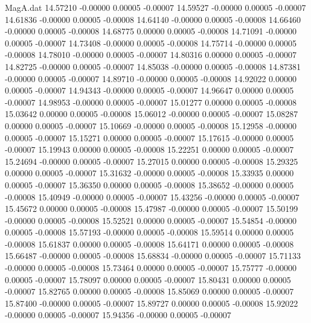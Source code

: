 \begin{filecontents}{MagA.dat}
  14.57210   -0.00000    0.00005   -0.00007
  14.59527   -0.00000    0.00005   -0.00007
  14.61836   -0.00000    0.00005   -0.00008
  14.64140   -0.00000    0.00005   -0.00008
  14.66460   -0.00000    0.00005   -0.00008
  14.68775    0.00000    0.00005   -0.00008
  14.71091   -0.00000    0.00005   -0.00007
  14.73408   -0.00000    0.00005   -0.00008
  14.75714   -0.00000    0.00005   -0.00008
  14.78010   -0.00000    0.00005   -0.00007
  14.80316    0.00000    0.00005   -0.00007
  14.82725   -0.00000    0.00005   -0.00007
  14.85038   -0.00000    0.00005   -0.00008
  14.87381   -0.00000    0.00005   -0.00007
  14.89710   -0.00000    0.00005   -0.00008
  14.92022    0.00000    0.00005   -0.00007
  14.94343   -0.00000    0.00005   -0.00007
  14.96647    0.00000    0.00005   -0.00007
  14.98953   -0.00000    0.00005   -0.00007
  15.01277    0.00000    0.00005   -0.00008
  15.03642    0.00000    0.00005   -0.00008
  15.06012   -0.00000    0.00005   -0.00007
  15.08287    0.00000    0.00005   -0.00007
  15.10669   -0.00000    0.00005   -0.00008
  15.12958   -0.00000    0.00005   -0.00007
  15.15271    0.00000    0.00005   -0.00007
  15.17615   -0.00000    0.00005   -0.00007
  15.19943    0.00000    0.00005   -0.00008
  15.22251    0.00000    0.00005   -0.00007
  15.24694   -0.00000    0.00005   -0.00007
  15.27015    0.00000    0.00005   -0.00008
  15.29325    0.00000    0.00005   -0.00007
  15.31632   -0.00000    0.00005   -0.00008
  15.33935    0.00000    0.00005   -0.00007
  15.36350    0.00000    0.00005   -0.00008
  15.38652   -0.00000    0.00005   -0.00008
  15.40949   -0.00000    0.00005   -0.00007
  15.43256   -0.00000    0.00005   -0.00007
  15.45672    0.00000    0.00005   -0.00008
  15.47987   -0.00000    0.00005   -0.00007
  15.50199   -0.00000    0.00005   -0.00008
  15.52521    0.00000    0.00005   -0.00007
  15.54854   -0.00000    0.00005   -0.00008
  15.57193   -0.00000    0.00005   -0.00008
  15.59514    0.00000    0.00005   -0.00008
  15.61837    0.00000    0.00005   -0.00008
  15.64171    0.00000    0.00005   -0.00008
  15.66487   -0.00000    0.00005   -0.00008
  15.68834   -0.00000    0.00005   -0.00007
  15.71133   -0.00000    0.00005   -0.00008
  15.73464    0.00000    0.00005   -0.00007
  15.75777   -0.00000    0.00005   -0.00007
  15.78097    0.00000    0.00005   -0.00007
  15.80431    0.00000    0.00005   -0.00007
  15.82765    0.00000    0.00005   -0.00008
  15.85069    0.00000    0.00005   -0.00007
  15.87400   -0.00000    0.00005   -0.00007
  15.89727    0.00000    0.00005   -0.00008
  15.92022   -0.00000    0.00005   -0.00007
  15.94356   -0.00000    0.00005   -0.00007

\end{filecontents}
